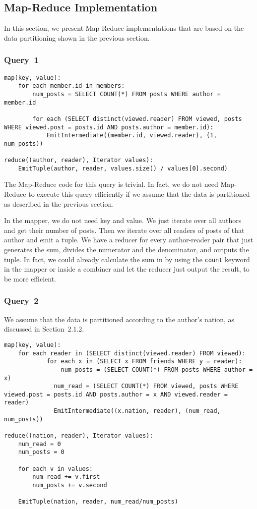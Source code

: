 \documentclass[12pt]{article}
\begin{document}
\subsection{Map-Reduce Implementation}
In this section, we present Map-Reduce implementations that are based on the data partitioning shown in the previous section.

\subsubsection{Query~1}
\begin{lstlisting}
map(key, value):
	for each member.id in members:
    	num_posts = SELECT COUNT(*) FROM posts WHERE author = member.id
        
        for each (SELECT distinct(viewed.reader) FROM viewed, posts WHERE viewed.post = posts.id AND posts.author = member.id):
        	EmitIntermediate((member.id, viewed.reader), (1, num_posts))
            
reduce((author, reader), Iterator values):
	EmitTuple(author, reader, values.size() / values[0].second)
\end{lstlisting}

The Map-Reduce code for this query is trivial. In fact, we do not need Map-Reduce to execute this query efficiently if we assume that the data is partitioned as described in the previous section.

In the mapper, we do not need key and value. We just iterate over all authors and get their number of posts. Then we iterate over all readers of posts of that author and emit a tuple. We have a reducer for every author-reader pair that just generates the sum, divides the numerator and the denominator, and outputs the tuple. In fact, we could already calculate the sum in by using the \lstinline{count} keyword in the mapper or inside a combiner and let the reducer just output the result, to be more efficient.

\subsubsection{Query~2}
We assume that the data is partitioned according to the author's nation, as discussed in Section~2.1.2.

\begin{lstlisting}
map(key, value):
	for each reader in (SELECT distinct(viewed.reader) FROM viewed):
    	    for each x in (SELECT x FROM friends WHERE y = reader):
        	    num_posts = (SELECT COUNT(*) FROM posts WHERE author = x)
              num_read = (SELECT COUNT(*) FROM viewed, posts WHERE viewed.post = posts.id AND posts.author = x AND viewed.reader = reader)
              EmitIntermediate((x.nation, reader), (num_read, num_posts))
          
reduce((nation, reader), Iterator values):
	num_read = 0
	num_posts = 0
    
	for each v in values:
		num_read += v.first
		num_posts += v.second
        
	EmitTuple(nation, reader, num_read/num_posts)
\end{lstlisting}
\end{document}
